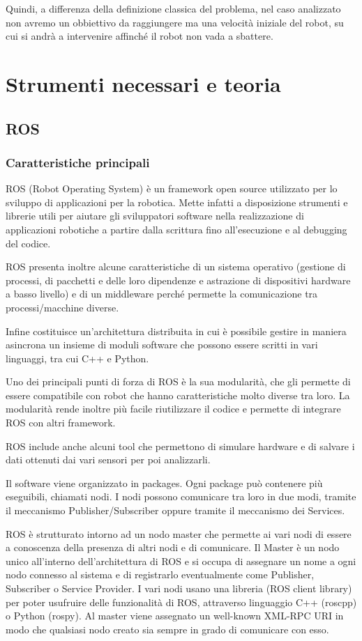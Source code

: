 \documentclass[Lau, binding=0.6cm, oneside]{sapthesis}
\begin{document}
Quindi, a differenza della definizione classica del problema, nel caso analizzato non avremo un obbiettivo da raggiungere ma una velocità iniziale del robot, su cui si andrà a intervenire affinché il robot non vada a sbattere.

\chapter{Strumenti necessari e teoria}
\section{ROS}
\subsection{Caratteristiche principali}
ROS (Robot Operating System) è un framework open source utilizzato per lo sviluppo di applicazioni per la robotica.
Mette infatti a disposizione strumenti e librerie utili per aiutare gli sviluppatori software nella realizzazione di applicazioni robotiche a partire dalla scrittura fino all’esecuzione e al debugging del codice.

ROS presenta inoltre alcune caratteristiche di un sistema operativo (gestione di processi, di pacchetti e delle loro dipendenze e astrazione di dispositivi hardware a basso livello) e di un middleware perché permette la comunicazione tra processi/macchine diverse.

Infine costituisce un’architettura distribuita in cui è possibile gestire in maniera asincrona un insieme di moduli software che possono essere scritti in vari linguaggi, tra cui C++ e Python.

Uno dei principali punti di forza di ROS è la sua modularità, che gli permette di essere compatibile con robot che hanno caratteristiche molto diverse tra loro.
La modularità rende inoltre più facile riutilizzare il codice e permette di integrare ROS con altri framework.

ROS include anche alcuni tool che permettono di simulare hardware e di salvare i dati ottenuti dai vari sensori per poi analizzarli.

Il software viene organizzato in packages. Ogni package può contenere più eseguibili, chiamati nodi.
I nodi possono comunicare tra loro in due modi, tramite il meccanismo Publisher/Subscriber oppure tramite il meccanismo dei Services.

ROS è strutturato intorno ad un nodo master che permette ai vari nodi di essere a conoscenza della presenza di altri nodi e di comunicare.
Il Master è un nodo unico all’interno dell’architettura di ROS e si occupa di assegnare un nome a ogni nodo connesso al sistema e di registrarlo eventualmente come Publisher, Subscriber o Service Provider.
I vari nodi usano una libreria (ROS client library) per poter usufruire delle funzionalità di ROS, attraverso linguaggio C++ (roscpp) o Python (rospy).
Al master viene assegnato un well-known XML-RPC URI in modo che qualsiasi nodo creato sia sempre in grado di comunicare con esso\cite{fonte3}.
\end{document}
